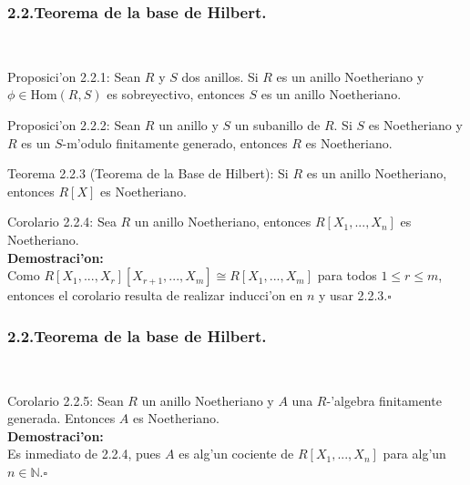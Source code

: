 \documentclass[10pt]{beamer}
\renewcommand{\N}{\mathbb{N}}
\renewcommand{\Hom}{\text{Hom}}
\begin{document}
\begin{frame}
\frametitle{2.2.Teorema de la base de Hilbert.}\\
\begin{block}{Proposici'on 2.2.1:}
Sean $R$ y $S$ dos anillos. Si $R$ es un anillo Noetheriano y $\phi \in \Hom (R,S)$ es sobreyectivo, entonces $S$ es un anillo Noetheriano.\\
\end{block}
\begin{block}{Proposici'on 2.2.2:}
 Sean $R$ un anillo y $S$ un subanillo de $R$. Si $S$ es Noetheriano y $R$ es un $S$-m'odulo finitamente generado, entonces $R$ es Noetheriano.\\
\end{block}
\begin{block}{Teorema 2.2.3 (Teorema de la Base de Hilbert):}
Si $R$ es un anillo Noetheriano, entonces $R[X]$ es Noetheriano.\\
\end{block}
\begin{block}{Corolario 2.2.4:}
Sea $R$ un anillo Noetheriano, entonces $R[X_1,...,X_n]$ es Noetheriano.\\
\textbf{Demostraci'on:}\\
Como $R[X_1,...,X_r][X_{r+1},...,X_m] \cong R[X_1,...,X_m]$ para todos $1 \leq r\leq m$, entonces el corolario resulta de realizar inducci'on en $n$ y usar 2.2.3.\hfill $\square$\\
\end{block}

\vspace{5cm}
\end{frame}

\begin{frame}
\frametitle{2.2.Teorema de la base de Hilbert.}\\
\begin{block}{Corolario 2.2.5:}
Sean $R$ un anillo Noetheriano y $A$ una $R$-'algebra finitamente generada. Entonces $A$ es Noetheriano.\\
\textbf{Demostraci'on:}\\
Es inmediato de 2.2.4, pues $A$ es alg'un cociente de $R[X_1,...,X_n]$ para alg'un $n \in \N$.\hfill $\square$\\
\end{block}
\vspace{6cm}
\end{frame}
\end{document}
